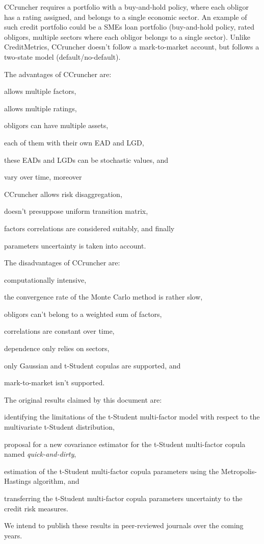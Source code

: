 \documentclass[11pt,fleqn]{book} %
\begin{document}
CCruncher requires a portfolio with a buy-and-hold policy, where each obligor 
has a rating assigned, and belongs to a single economic sector. An example of 
such credit portfolio could be a SMEs loan portfolio (buy-and-hold policy, 
rated obligors, multiple sectors where each obligor belongs to a single 
sector). Unlike CreditMetrics\texttrademark{}, CCruncher doesn't follow a 
mark-to-market account, but follows a two-state model (default/no-default). 

The advantages of CCruncher are: 
\begin{inparaenum}[1)]
	\item allows multiple factors,
	\item allows multiple ratings,
	\item obligors can have multiple assets,
	\item each of them with their own EAD and LGD,
	\item these EADs and LGDs can be stochastic values, and
	\item vary over time, moreover
	\item CCruncher allows risk disaggregation,
	\item doesn't presuppose uniform transition matrix,
	\item factors correlations are considered suitably, and finally
	\item parameters uncertainty is taken into account.
\end{inparaenum}

The disadvantages of CCruncher are: 
\begin{inparaenum}[1)]
	\item computationally intensive,
	\item the convergence rate of the Monte Carlo method is rather slow,
	\item obligors can't belong to a weighted sum of factors,
	\item correlations are constant over time,
	\item dependence only relies on sectors,
	\item only Gaussian and t-Student copulas are supported, and
	\item mark-to-market isn't supported.
\end{inparaenum}

The original results claimed by this document are: 
\begin{inparaenum}[1)]
	\item identifying the limitations of the t-Student multi-factor model with 
	respect to the multivariate t-Student distribution,
	\item proposal for a new covariance estimator for the t-Student multi-factor 
	copula named \emph{quick-and-dirty},
	\item estimation of the t-Student multi-factor copula parameters using the 
	Metropolis-Hastings algorithm, and
	\item transferring the t-Student multi-factor copula parameters uncertainty 
	to the credit risk measures.
\end{inparaenum}
We intend to publish these results in peer-reviewed journals over the coming years.
\end{document}
